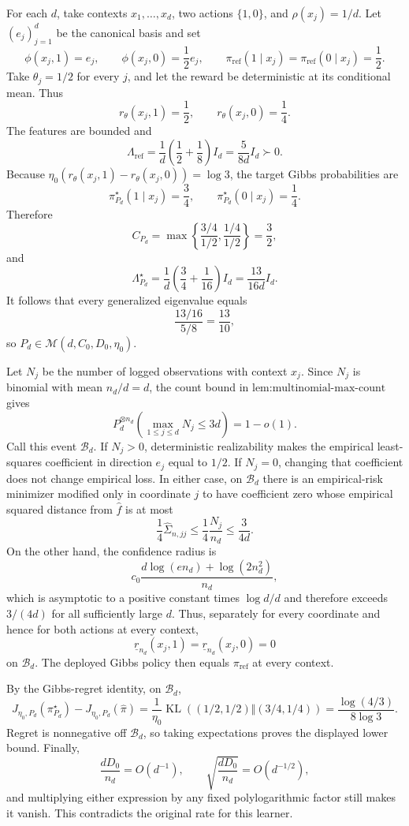 For each \(d\), take contexts \(x_1,\ldots,x_d\), two actions \(\{1,0\}\), and \(\rho(x_j)=1/d\). Let \((e_j)_{j=1}^d\) be the canonical basis and set
\[
\phi(x_j,1)=e_j,
\qquad
\phi(x_j,0)=\frac12e_j,
\qquad
\pi_{\mathrm{ref}}(1\mid x_j)=\pi_{\mathrm{ref}}(0\mid x_j)=\frac12.
\]
Take \(\theta_j=1/2\) for every \(j\), and let the reward be deterministic at its conditional mean. Thus
\[
r_\theta(x_j,1)=\frac12,
\qquad
r_\theta(x_j,0)=\frac14.
\]
The features are bounded and
\[
\Lambda_{\mathrm{ref}}
=\frac1d\left(\frac12+\frac18\right)I_d
=\frac{5}{8d}I_d\succ0.
\]
Because \(\eta_0(r_\theta(x_j,1)-r_\theta(x_j,0))=\log3\), the target Gibbs probabilities are
\[
\pi_{P_d}^\star(1\mid x_j)=\frac34,
\qquad
\pi_{P_d}^\star(0\mid x_j)=\frac14.
\]
Therefore
\[
C_{P_d}=\max\left\{\frac{3/4}{1/2},\frac{1/4}{1/2}\right\}=\frac32,
\]
and
\[
\Lambda_{P_d}^\star
=\frac1d\left(\frac34+\frac1{16}\right)I_d
=\frac{13}{16d}I_d.
\]
It follows that every generalized eigenvalue equals
\[
\frac{13/16}{5/8}=\frac{13}{10},
\]
so \(P_d\in\mathcal M(d,C_0,D_0,\eta_0)\).

Let \(N_j\) be the number of logged observations with context \(x_j\). Since \(N_j\) is binomial with mean \(n_d/d=d\), the count bound in \(\text{lem:multinomial-max-count}\) gives
\[
P_d^{\otimes n_d}\left(\max_{1\le j\le d}N_j\le3d\right)=1-o(1).
\]
Call this event \(\mathcal B_d\). If \(N_j>0\), deterministic realizability makes the empirical least-squares coefficient in direction \(e_j\) equal to \(1/2\). If \(N_j=0\), changing that coefficient does not change empirical loss. In either case, on \(\mathcal B_d\) there is an empirical-risk minimizer modified only in coordinate \(j\) to have coefficient zero whose empirical squared distance from \(\widehat f\) is at most
\[
\frac14\widehat\Sigma_{n,jj}
\le\frac14\frac{N_j}{n_d}
\le\frac{3}{4d}.
\]
On the other hand, the confidence radius is
\[
c_0\frac{d\log(en_d)+\log(2n_d^2)}{n_d},
\]
which is asymptotic to a positive constant times \(\log d/d\) and therefore exceeds \(3/(4d)\) for all sufficiently large \(d\). Thus, separately for every coordinate and hence for both actions at every context,
\[
\underline r_{n_d}(x_j,1)=\underline r_{n_d}(x_j,0)=0
\]
on \(\mathcal B_d\). The deployed Gibbs policy then equals \(\pi_{\mathrm{ref}}\) at every context.

By the Gibbs-regret identity, on \(\mathcal B_d\),
\[
J_{\eta_0,P_d}(\pi_{P_d}^\star)-J_{\eta_0,P_d}(\widehat\pi)
=\frac1{\eta_0}\operatorname{KL}\left((1/2,1/2)\Vert(3/4,1/4)\right)
=\frac{\log(4/3)}{8\log3}.
\]
Regret is nonnegative off \(\mathcal B_d\), so taking expectations proves the displayed lower bound. Finally,
\[
\frac{dD_0}{n_d}=O(d^{-1}),
\qquad
\sqrt{\frac{dD_0}{n_d}}=O(d^{-1/2}),
\]
and multiplying either expression by any fixed polylogarithmic factor still makes it vanish. This contradicts the original rate for this learner.
